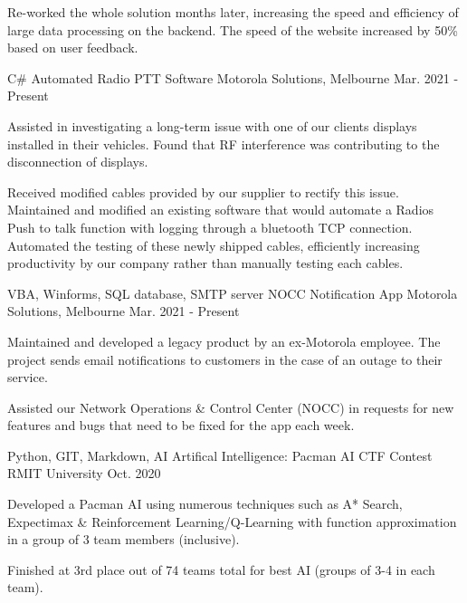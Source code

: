 \begin{cventries}
{\begin{cvitems}
        \item {Re-worked the whole solution months later, increasing the speed and efficiency of large data processing on the backend. The speed of the website increased by 50\% based on user feedback.}
      \end{cvitems}
    }
  \cventry
    {C\#}
    {Automated Radio PTT Software}
    {Motorola Solutions, Melbourne}
    {Mar. 2021 - Present}
    {
      \begin{cvitems}
        \item {Assisted in investigating a long-term issue with one of our clients displays installed in their vehicles. Found that RF interference was contributing to the disconnection of displays.}
        \item {Received modified cables provided by our supplier to rectify this issue. Maintained and modified an existing software that would automate a Radios Push to talk function with logging through a bluetooth TCP connection. Automated the testing of these newly shipped cables, efficiently increasing productivity by our company rather than manually testing each cables.}
      \end{cvitems}
    }
  \cventry
    {VBA, Winforms, SQL database, SMTP server}
    {NOCC Notification App}
    {Motorola Solutions, Melbourne}
    {Mar. 2021 - Present}
    {
      \begin{cvitems}
        \item {Maintained and developed a legacy product by an ex-Motorola employee. The project sends email notifications to customers in the case of an outage to their service.}
        \item {Assisted our Network Operations \& Control Center (NOCC) in requests for new features and bugs that need to be fixed for the app each week.}
      \end{cvitems}
    }
  \cventry
    {Python, GIT, Markdown, AI}
    {Artifical Intelligence: Pacman AI CTF Contest}
    {RMIT University}
    {Oct. 2020}
    {
      \begin{cvitems}
        \item {Developed a Pacman AI using numerous techniques such as A* Search, Expectimax \& Reinforcement Learning/Q-Learning with function approximation in a group of 3 team members (inclusive).}
        \item {Finished at 3rd place out of 74 teams total for best AI (groups of 3-4 in each team).}
      \end{cvitems}
    }
\end{cventries}
